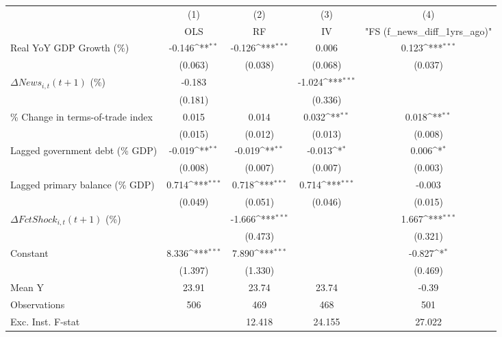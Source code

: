 {
\def\sym#1{\ifmmode^{#1}\else\(^{#1}\)\fi}
\begin{tabular}{l*{4}{c}}
\toprule
                    &\multicolumn{1}{c}{(1)}&\multicolumn{1}{c}{(2)}&\multicolumn{1}{c}{(3)}&\multicolumn{1}{c}{(4)}\\
                    &\multicolumn{1}{c}{OLS}&\multicolumn{1}{c}{RF}&\multicolumn{1}{c}{IV}&\multicolumn{1}{c}{ "FS (f_news_diff_1yrs_ago)" }\\
\midrule
Real YoY GDP Growth (\%)&      -0.146\sym{**} &      -0.126\sym{***}&       0.006         &       0.123\sym{***}\\
                    &     (0.063)         &     (0.038)         &     (0.068)         &     (0.037)         \\
\addlinespace
$ \Delta News_{i,t}(t+1)$ (\%)&      -0.183         &                     &      -1.024\sym{***}&                     \\
                    &     (0.181)         &                     &     (0.336)         &                     \\
\addlinespace
\% Change in terms-of-trade index&       0.015         &       0.014         &       0.032\sym{**} &       0.018\sym{**} \\
                    &     (0.015)         &     (0.012)         &     (0.013)         &     (0.008)         \\
\addlinespace
Lagged government debt (\% GDP)&      -0.019\sym{**} &      -0.019\sym{**} &      -0.013\sym{*}  &       0.006\sym{*}  \\
                    &     (0.008)         &     (0.007)         &     (0.007)         &     (0.003)         \\
\addlinespace
Lagged primary balance (\% GDP)&       0.714\sym{***}&       0.718\sym{***}&       0.714\sym{***}&      -0.003         \\
                    &     (0.049)         &     (0.051)         &     (0.046)         &     (0.015)         \\
\addlinespace
$ \Delta FctShock_{i,t}(t+1)$ (\%)&                     &      -1.666\sym{***}&                     &       1.667\sym{***}\\
                    &                     &     (0.473)         &                     &     (0.321)         \\
\addlinespace
Constant            &       8.336\sym{***}&       7.890\sym{***}&                     &      -0.827\sym{*}  \\
                    &     (1.397)         &     (1.330)         &                     &     (0.469)         \\
\midrule
Mean Y              &       23.91         &       23.74         &       23.74         &       -0.39         \\
Observations        &         506         &         469         &         468         &         501         \\
Exc. Inst. F-stat   &                     &      12.418         &      24.155         &      27.022         \\
\bottomrule
\end{tabular}
}

